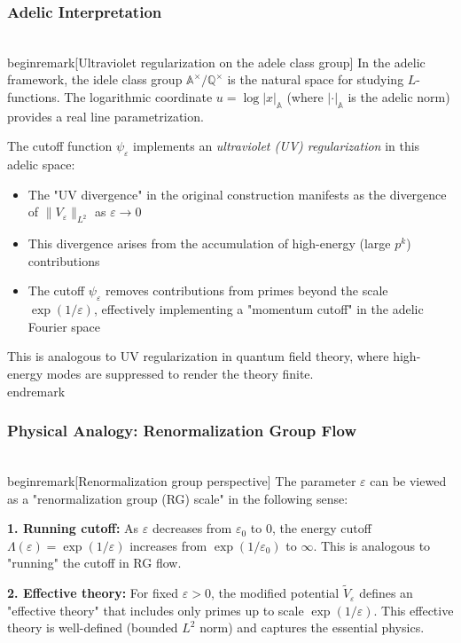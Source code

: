 ﻿\documentclass[12pt,a4paper]{article}
\theoremstyle{definition}
\theoremstyle{remark}
\newtheorem{remark}[theorem]{Remark}
\begin{document}
\subsubsection{Adelic Interpretation}

\\begin{remark}[Ultraviolet regularization on the adele class group]\label{interp:adelic}
In the adelic framework, the idele class group $\mathbb{A}^\times / \mathbb{Q}^\times$ is the natural space for studying $L$-functions. The logarithmic coordinate $u = \log |x|_{\mathbb{A}}$ (where $|\cdot|_{\mathbb{A}}$ is the adelic norm) provides a real line parametrization.

The cutoff function $\psi_\varepsilon$ implements an \emph{ultraviolet (UV) regularization} in this adelic space:
\begin{itemize}
\item The "UV divergence" in the original construction manifests as the divergence of $\|V_\varepsilon\|_{L^2}$ as $\varepsilon \to 0$
\item This divergence arises from the accumulation of high-energy (large $p^k$) contributions
\item The cutoff $\psi_\varepsilon$ removes contributions from primes beyond the scale $\exp(1/\varepsilon)$, effectively implementing a "momentum cutoff" in the adelic Fourier space
\end{itemize}

This is analogous to UV regularization in quantum field theory, where high-energy modes are suppressed to render the theory finite.
\\end{remark}

\subsubsection{Physical Analogy: Renormalization Group Flow}

\\begin{remark}[Renormalization group perspective]\label{interp:RG}
The parameter $\varepsilon$ can be viewed as a "renormalization group (RG) scale" in the following sense:

\textbf{1. Running cutoff:} As $\varepsilon$ decreases from $\varepsilon_0$ to 0, the energy cutoff $\Lambda(\varepsilon) = \exp(1/\varepsilon)$ increases from $\exp(1/\varepsilon_0)$ to $\infty$. This is analogous to "running" the cutoff in RG flow.

\textbf{2. Effective theory:} For fixed $\varepsilon > 0$, the modified potential $\widetilde{V}_\varepsilon$ defines an "effective theory" that includes only primes up to scale $\exp(1/\varepsilon)$. This effective theory is well-defined (bounded $L^2$ norm) and captures the essential physics.
\end{document}
